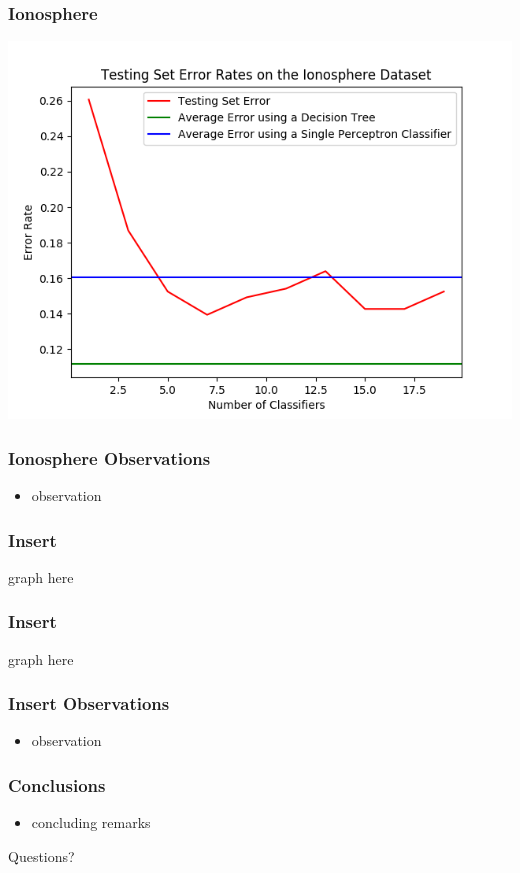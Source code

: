 \documentclass{beamer}
\begin{document}
\begin{frame}
\frametitle{Ionosphere}
\begin{center}
\includegraphics[width=0.8\linewidth]{Ionosphere_different_classifiers.png}
\end{center}
\end{frame}
\begin{frame}
\frametitle{Ionosphere Observations}
\begin{itemize}
\item observation 
\end{itemize}
\end{frame}
\begin{frame}
\frametitle{Insert}
\begin{center}
graph here
\end{center}
\end{frame}
\begin{frame}
\frametitle{Insert}
\begin{center}
graph here 
\end{center}
\end{frame}
\begin{frame}
\frametitle{Insert Observations}
\begin{itemize}
\item observation 
\end{itemize}
\end{frame}
\begin{frame}
\frametitle{Conclusions}
\begin{itemize}
\item concluding remarks 
\end{itemize}
\end{frame}
\begin{frame}
\Huge{\centerline{Questions?}}
\end{frame}
\end{document}
